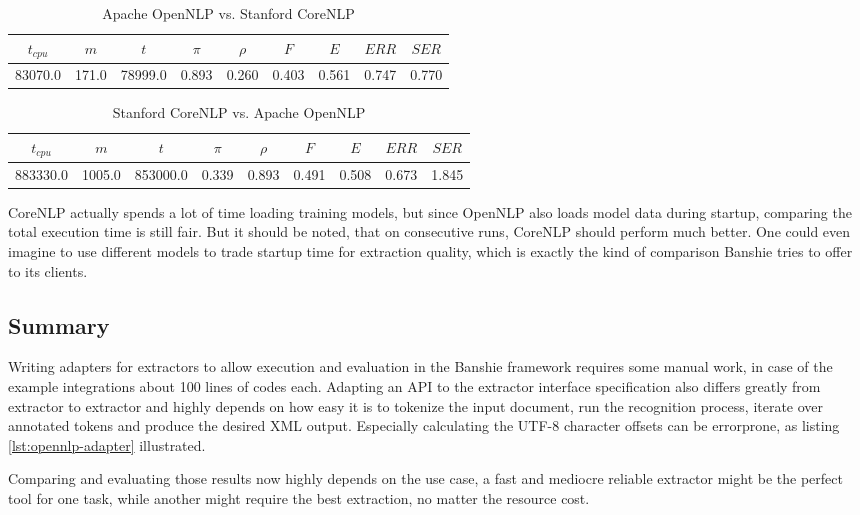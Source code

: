 \begin{table}[H]
\centering
\begin{tabular*}{\textwidth}{ccccccccc}
	\toprule
	$t_{cpu}$ & $m$ & $t$ & $\pi$ & $\rho$ & $F$ & $E$ & $ERR$ & $SER$ \\
	\midrule
	83070.0 & 171.0 & 78999.0 & 0.893 & 0.260  & 0.403 & 0.561 & 0.747 & 0.770 \\
	\bottomrule
\end{tabular*}
\caption{Apache OpenNLP vs. Stanford CoreNLP}
\label{tbl:opennlp-vs-corenlp}
\end{table}

\begin{table}[H]
\centering
\begin{tabular*}{\textwidth}{ccccccccc}
	\toprule
	$t_{cpu}$ & $m$ & $t$ & $\pi$ & $\rho$ & $F$ & $E$ & $ERR$ & $SER$ \\
	\midrule
	883330.0 & 1005.0 & 853000.0 & 0.339 & 0.893 & 0.491 & 0.508 & 0.673 & 1.845 \\
	\bottomrule
\end{tabular*}
\caption{Stanford CoreNLP vs. Apache OpenNLP}
\label{tbl:corenlp-vs-opennlp}
\end{table}

CoreNLP actually spends a lot of time loading training models, but since OpenNLP also loads model data during startup, comparing the total execution time is still fair. But it should be noted, that on consecutive runs, CoreNLP should perform much better. One could even imagine to use different models to trade startup time for extraction quality, which is exactly the kind of comparison Banshie tries to offer to its clients.

\subsection{Summary}
Writing adapters for extractors to allow execution and evaluation in the Banshie framework requires some manual work, in case of the example integrations about 100 lines of codes each. Adapting an \gls{API} to the extractor interface specification also differs greatly from extractor to extractor and highly depends on how easy it is to tokenize the input document, run the recognition process, iterate over annotated tokens and produce the desired \gls{XML} output. Especially calculating the UTF-8 character offsets can be errorprone, as listing \ref{lst:opennlp-adapter} illustrated.

Comparing and evaluating those results now highly depends on the use case, a fast and mediocre reliable extractor might be the perfect tool for one task, while another might require the best extraction, no matter the resource cost.